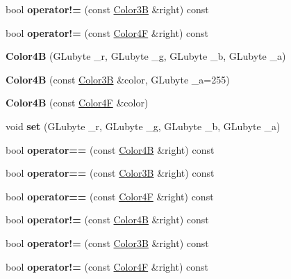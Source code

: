 \begin{DoxyCompactItemize}
bool {\bfseries operator!=} (const \hyperlink{structColor3B}{Color3B} \&right) const
\item 
\mbox{\label{structColor4B_acc5949f1115e474aa547d3274fd988d2}} 
bool {\bfseries operator!=} (const \hyperlink{structColor4F}{Color4F} \&right) const
\item 
\mbox{\label{structColor4B_ad7300201bf96c3868b738d9227a41d0d}} 
{\bfseries Color4B} (G\+Lubyte \+\_\+r, G\+Lubyte \+\_\+g, G\+Lubyte \+\_\+b, G\+Lubyte \+\_\+a)
\item 
\mbox{\label{structColor4B_a633e3a98bbfc5ba2b7371657748355ed}} 
{\bfseries Color4B} (const \hyperlink{structColor3B}{Color3B} \&color, G\+Lubyte \+\_\+a=255)
\item 
\mbox{\label{structColor4B_aa4231abd6ba89ae3ab94bf2ae547c46c}} 
{\bfseries Color4B} (const \hyperlink{structColor4F}{Color4F} \&color)
\item 
\mbox{\label{structColor4B_aea739bdeaed827a7f67ab180987cca3f}} 
void {\bfseries set} (G\+Lubyte \+\_\+r, G\+Lubyte \+\_\+g, G\+Lubyte \+\_\+b, G\+Lubyte \+\_\+a)
\item 
\mbox{\label{structColor4B_a1155bf0daaab1b04747aeee62a20984f}} 
bool {\bfseries operator==} (const \hyperlink{structColor4B}{Color4B} \&right) const
\item 
\mbox{\label{structColor4B_ac126dea351344cb23024a545932de5e2}} 
bool {\bfseries operator==} (const \hyperlink{structColor3B}{Color3B} \&right) const
\item 
\mbox{\label{structColor4B_aa8d349ab7315761735ae8484083e337b}} 
bool {\bfseries operator==} (const \hyperlink{structColor4F}{Color4F} \&right) const
\item 
\mbox{\label{structColor4B_a983918192f9ab7c135a1c55bbb26e554}} 
bool {\bfseries operator!=} (const \hyperlink{structColor4B}{Color4B} \&right) const
\item 
\mbox{\label{structColor4B_a2a327073c83eabc3068b5a0c83eeb84e}} 
bool {\bfseries operator!=} (const \hyperlink{structColor3B}{Color3B} \&right) const
\item 
\mbox{\label{structColor4B_acc5949f1115e474aa547d3274fd988d2}} 
bool {\bfseries operator!=} (const \hyperlink{structColor4F}{Color4F} \&right) const
\end{DoxyCompactItemize}
